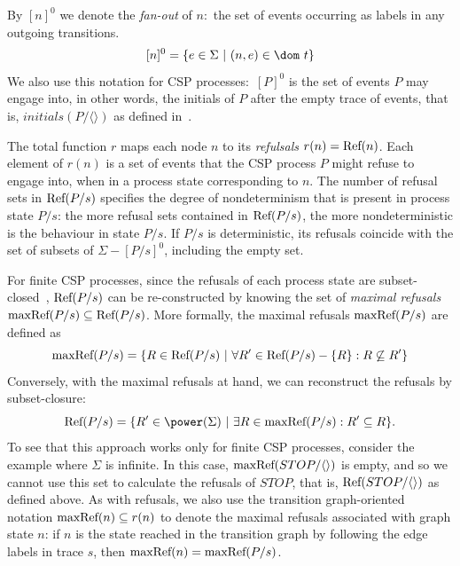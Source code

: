 By $[n]^0$ we denote the \emph{fan-out} of $n$:~the set of events occurring
as labels in any outgoing transitions.
$$
[n]^0 = \{ e\in\Sigma~|~(n,e)\in\dom~t \}
$$
We also use this notation for CSP processes:~$[P]^0$ is the set
of events $P$ may engage into, in other words, the initials of $P$ after the
empty trace of events, that is, $initials(P/\langle\rangle)$ as defined
in~\cite{Roscoe2010}.

The total function $r$ maps each node $n$ to its \emph{refulsals} $r(n) =
\text{Ref}(n)$. Each element of $r(n)$ is a set of events that the CSP process $P$
might refuse to engage into, when in a process state corresponding to $n$.
The number of refusal sets in $\text{Ref}(P/s)$ specifies the degree of
nondeterminism that is present in process state $P/s$: the more refusal sets
contained in  $\text{Ref}(P/s)$, the more nondeterministic is the behaviour in
state $P/s$. If $P/s$ is deterministic, its refusals coincide with the set of
subsets of $\Sigma - [P/s]^0$, including the empty set.

For finite CSP processes, since the refusals of each process state are
subset-closed~\cite{Hoare:1985:CSP:3921,Roscoe2010}, $\text{Ref}(P/s)$ can be
re-constructed by knowing the set of \emph{maximal refusals}
$\text{maxRef}(P/s)\subseteq\text{Ref}(P/s)$. More formally, the maximal refusals
$\text{maxRef}(P/s)$ are defined as
$$
\text{maxRef}(P/s) = \{ R \in\text{Ref}(P/s)~|~\forall R'\in \text{Ref}(P/s) - \{ R\}: R \not\subseteq R'\}
$$
Conversely, with the maximal refusals at hand, we can reconstruct the refusals by subset-closure:
$$
\refs(P/s) = \{ R'\in\power(\Sigma)~|~\exists R\in \maxrefs(P/s): R'\subseteq R \}.
$$
To see that this approach works only for finite CSP processes, consider the
example where $\Sigma$ is infinite. In this case,
$\text{maxRef}(STOP/\langle\rangle)$ is empty, and so we cannot use this set to
calculate the refusals of $STOP$, that is, $\text{Ref}(STOP/\langle\rangle)$ as
defined above. As with refusals, we also use the transition graph-oriented
notation $\text{maxRef}(n) \subseteq r(n)$ to denote the maximal refusals
associated with graph state $n$: if $n$ is the state reached in the
transition graph by following the edge labels in trace $s$, then $\text{maxRef}(n)
= \text{maxRef}(P/s)$.

